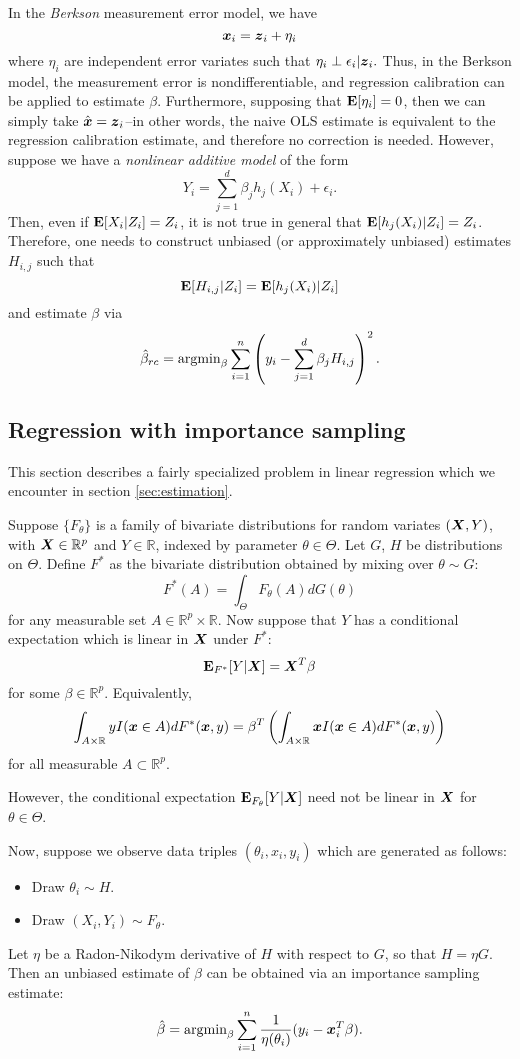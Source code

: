 \documentclass[12pt]{article}
\begin{document}
In the \emph{Berkson} measurement error model, we have
\[
\boldsymbol{x}_i = \boldsymbol{z}_i + \eta_i
\]
where $\eta_i$ are independent error variates such that
$\eta_i \perp \epsilon_i | \boldsymbol{z}_i.$ Thus, in the Berkson model, the
measurement error is nondifferentiable, and regression calibration can
be applied to estimate $\beta$.  Furthermore, supposing that
$\textbf{E}[\eta_i]=0$, then we can simply take $\hat{\boldsymbol{x}} = \boldsymbol{z}_i$--in other
words, the naive OLS estimate is equivalent to the regression
calibration estimate, and therefore no correction is needed.
However, suppose we have a \emph{nonlinear additive model} of the form
\[
Y_i = \sum_{j=1}^d \beta_j h_j(X_i) + \epsilon_i.
\]
Then, even if $\textbf{E}[X_i|Z_i] = Z_i$, it is not true in general that
$\textbf{E}[h_j(X_i)|Z_i] = Z_i$.  Therefore, one needs to construct unbiased
(or approximately unbiased) estimates $H_{i,j}$ such that
\[
\textbf{E}[H_{i,j}|Z_i] = \textbf{E}[h_j(X_i)|Z_i]
\]
and estimate $\beta$ via
\[
\hat{\beta}_{rc} = \text{argmin}_\beta \sum_{i=1}^n \left(y_i - \sum_{j=1}^d \beta_j H_{i, j} \right)^2.
\]

\subsection{Regression with importance sampling}

This section describes a fairly specialized problem in linear
regression which we encounter in section \ref{sec:estimation}.

Suppose $\{F_\theta\}$ is a family of bivariate distributions for
random variates $(\boldsymbol{X}, Y)$, with $\boldsymbol{X} \in \mathbb{R}^p$ and
$Y \in \mathbb{R}$, indexed by parameter $\theta \in \Theta.$ Let $G$,
$H$ be distributions on $\Theta$.  Define $F^*$ as the bivariate
distribution obtained by mixing over $\theta \sim G$:
\[
F^*(A) = \int_\Theta F_\theta(A) dG(\theta)
\]
for any measurable set $A \in \mathbb{R}^p \times \mathbb{R}$.  Now
suppose that $Y$ has a conditional expectation which is linear in
$\boldsymbol{X}$ under $F^*$:
\[
\textbf{E}_{F^*}[Y|\boldsymbol{X}] = \boldsymbol{X}^T \beta
\]
for some $\beta \in \mathbb{R}^p$.
Equivalently,
\[
\int_{A \times \mathbb{R}} y I(\boldsymbol{x} \in A) dF^*(\boldsymbol{x}, y) = \beta^T \left(\int_{A \times \mathbb{R}} \boldsymbol{x} I(\boldsymbol{x} \in A) dF^*(\boldsymbol{x}, y)\right)
\]
for all measurable $A \subset \mathbb{R}^p$.

However, the conditional expectation $\textbf{E}_{F_\theta}[Y|\boldsymbol{X}]$ need not
be linear in $\boldsymbol{X}$ for $\theta \in \Theta$.

Now, suppose we observe data
triples $(\theta_i, x_i, y_i)$ which are generated as follows:
\begin{itemize}
\item Draw $\theta_i \sim H$.
\item Draw $(X_i, Y_i) \sim F_\theta$.
\end{itemize}
Let $\eta$ be a Radon-Nikodym derivative of $H$ with respect to $G$, so that $H = \eta G$.
Then an unbiased estimate of $\beta$ can be obtained via an importance sampling estimate:
\[
\hat{\beta} = \text{argmin}_\beta \sum_{i=1}^n \frac{1}{\eta(\theta_i)} (y_i - \boldsymbol{x}_i^T \beta).
\]
\end{document}
